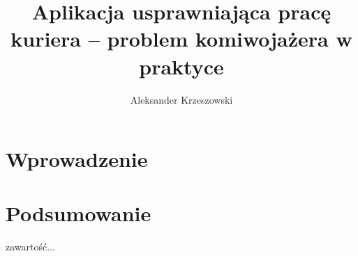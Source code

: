 \documentclass[10pt,a4paper]{report}
\begin{document}
	\author{Aleksander Krzeszowski}
	\title{Aplikacja usprawniająca pracę kuriera -- problem komiwojażera w praktyce}
	\maketitle
	
	\tableofcontents
	
	\chapter{Wprowadzenie}
	
	
	\chapter{Podsumowanie}
	
	\begin{thebibliography}{9}
		zawartość...
	\end{thebibliography}
\end{document}
